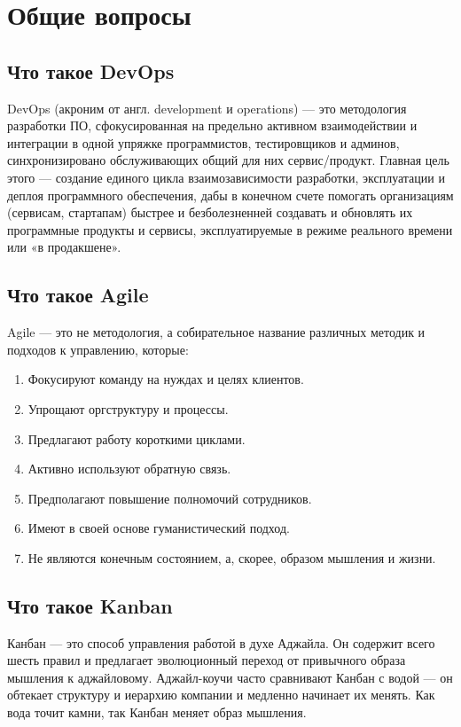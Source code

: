 \chapter{Общие вопросы}

\section{Что такое DevOps}

DevOps (акроним от англ. development и operations) — это методология разработки ПО, сфокусированная на предельно активном взаимодействии и интеграции в одной упряжке программистов, тестировщиков и админов, синхронизировано обслуживающих общий для них сервис/продукт. Главная цель этого — создание единого цикла взаимозависимости разработки, эксплуатации и деплоя программного обеспечения, дабы в конечном счете помогать организациям (сервисам, стартапам) быстрее и безболезненней создавать и обновлять их программные продукты и сервисы, эксплуатируемые в режиме реального времени или «в продакшене».	

\section{Что такое Agile}
Agile — это не методология, а собирательное название различных методик и подходов к управлению, которые:

\begin{enumerate}
\item Фокусируют команду на нуждах и целях клиентов.
\item Упрощают оргструктуру и процессы.
\item Предлагают работу короткими циклами.
\item Активно используют обратную связь.
\item Предполагают повышение полномочий сотрудников.
\item Имеют в своей основе гуманистический подход.
\item Не являются конечным состоянием, а, скорее, образом мышления и жизни.
\end{enumerate}

\section{Что такое Kanban}

Канбан — это способ управления работой в духе Аджайла. Он содержит всего шесть правил и предлагает эволюционный переход от привычного образа мышления к аджайловому. Аджайл-коучи часто сравнивают Канбан с водой — он обтекает структуру и иерархию компании и медленно начинает их менять. Как вода точит камни, так Канбан меняет образ мышления.

